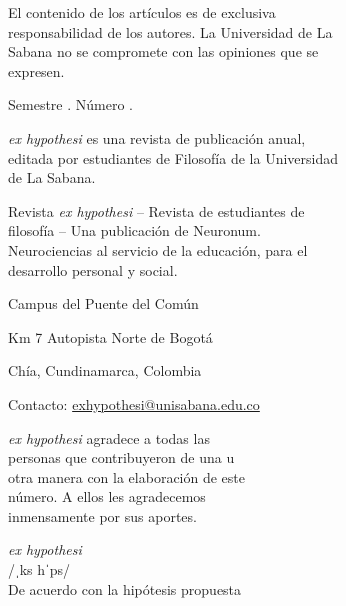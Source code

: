 {\begin{flushleft}
El contenido de los artículos es de exclusiva\\
responsabilidad de los autores. La Universidad de La\\
Sabana no se compromete con las opiniones que se\\
expresen.

Semestre \semestre{}. Número \numeroRevista{}.

\textit{ex hypothesi} es una revista de publicación anual,\\
editada por estudiantes de Filosofía de la Universidad\\
de La Sabana.

Revista \textit{ex hypothesi} – Revista de estudiantes de\\
filosofía – Una publicación de Neuronum.\\
Neurociencias al servicio de la educación, para el\\
desarrollo personal y social.

Campus del Puente del Común

Km 7 Autopista Norte de Bogotá

Chía, Cundinamarca, Colombia

\noindent Contacto: \href{mailto:exhypothesi@unisabana.edu.co}{exhypothesi@unisabana.edu.co}

\end{flushleft}

\newpage

\begin{flushleft}
	\textit{ex hypothesi} agradece a todas las\\
	personas que contribuyeron de una u\\
	otra manera con la elaboración de este\\
	número. A ellos les agradecemos\\
	inmensamente por sus aportes.\\[6cm]
\end{flushleft}

\begin{flushright}
	\textit{ex hypothesi}\\
	/ˌ\textepsilon ks h\textturnv \textsci ˈp\textturnscripta \texttheta \textschwa s\textturnv \textsci/\\
	De acuerdo con la hipótesis propuesta
\end{flushright}

}			%